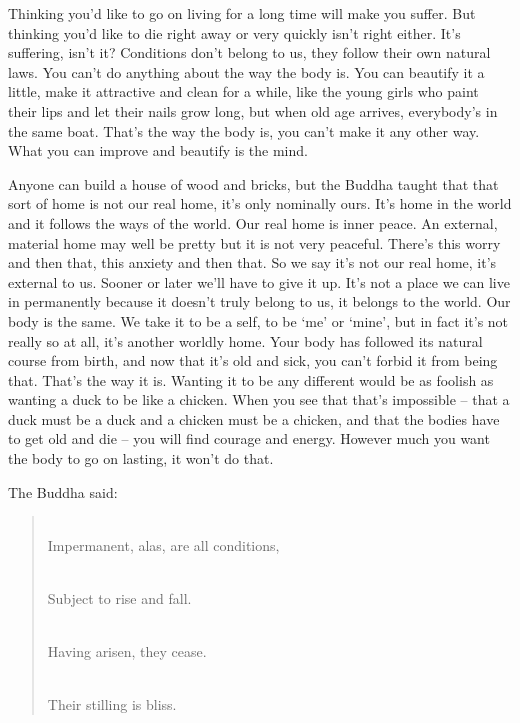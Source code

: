 Thinking you'd like to go on living for a long time will make you suffer. But thinking you'd like to die right away or very quickly isn't right either. It's suffering, isn't it? Conditions don't belong to us, they follow their own natural laws. You can't do anything about the way the body is. You can beautify it a little, make it attractive and clean for a while, like the young girls who paint their lips and let their nails grow long, but when old age arrives, everybody's in the same boat. That's the way the body is, you can't make it any other way. What you can improve and beautify is the mind.

Anyone can build a house of wood and bricks, but the Buddha taught that that sort of home is not our real home, it's only nominally ours. It's home in the world and it follows the ways of the world. Our real home is inner peace. An external, material home may well be pretty but it is not very peaceful. There's this worry and then that, this anxiety and then that. So we say it's not our real home, it's external to us. Sooner or later we'll have to give it up. It's not a place we can live in permanently because it doesn't truly belong to us, it belongs to the world. Our body is the same. We take it to be a self, to be `me' or `mine', but in fact it's not really so at all, it's another worldly home. Your body has followed its natural course from birth, and now that it's old and sick, you can't forbid it from being that. That's the way it is. Wanting it to be any different would be as foolish as wanting a duck to be like a chicken. When you see that that's impossible -- that a duck must be a duck and a chicken must be a chicken, and that the bodies have to get old and die -- you will find courage and energy. However much you want the body to go on lasting, it won't do that.

The Buddha said:
\begin{verse}
\\
Impermanent, alas, are all conditions,

\\
Subject to rise and fall.

\\
Having arisen, they cease.

\\
Their stilling is bliss.
\end{verse}

